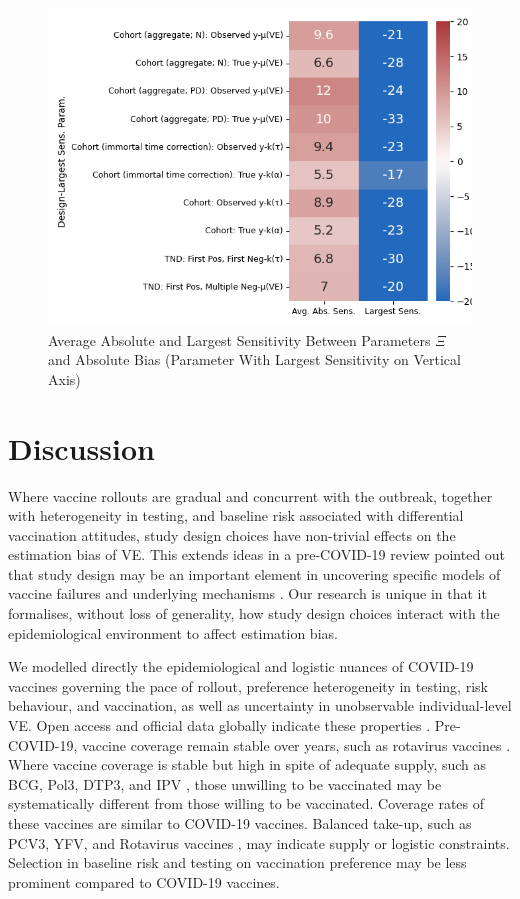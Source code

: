 \documentclass[12pt]{article}
\begin{document}
\begin{figure}[H]
	\centering
	\caption{Average Absolute and Largest Sensitivity Between Parameters $\Xi$ and Absolute Bias (Parameter With Largest Sensitivity on Vertical Axis)}
	\includegraphics[scale=0.7]{VEMethod_Drivers1b_FEest_Li_MSpec_Robustness_Heatmap.png}
\end{figure}

\section{Discussion}

Where vaccine rollouts are gradual and concurrent with the outbreak, together with heterogeneity in testing, and baseline risk associated with differential vaccination attitudes, study design choices have non-trivial effects on the estimation bias of VE. This extends ideas in a pre-COVID-19 review pointed out that study design may be an important element in uncovering specific models of vaccine failures and underlying mechanisms \citep{crowcroft2018framework}. Our research is unique in that it formalises, without loss of generality, how study design choices interact with the epidemiological environment to affect estimation bias. 

We modelled directly the epidemiological and logistic nuances of COVID-19 vaccines governing the pace of rollout, preference heterogeneity in testing, risk behaviour, and vaccination, as well as uncertainty in unobservable individual-level VE. Open access and official data globally indicate these properties \citep{ritchie2020coronavirus}. Pre-COVID-19, vaccine coverage remain stable over years, such as rotavirus vaccines \citep{hungerford2018rotavirus}. Where vaccine coverage is stable but high in spite of adequate supply, such as BCG, Pol3, DTP3, and IPV \citep{vanderslott2013vaccination}, those unwilling to be vaccinated may be systematically different from those willing to be vaccinated. Coverage rates of these vaccines are similar to COVID-19 vaccines. Balanced take-up, such as PCV3, YFV, and Rotavirus vaccines \citep{vanderslott2013vaccination}, may indicate supply or logistic constraints. Selection in baseline risk and testing on vaccination preference may be less prominent compared to COVID-19 vaccines.
\end{document}
